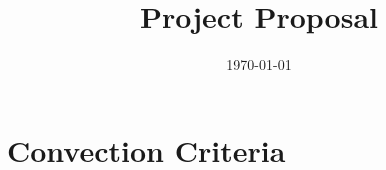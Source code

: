 \documentclass{uva-inf-article}
\title{Project Proposal}
\date{\today}
\numberwithin{equation}{section}
\begin{document}
\maketitle


\section{Convection Criteria}





\end{document}
